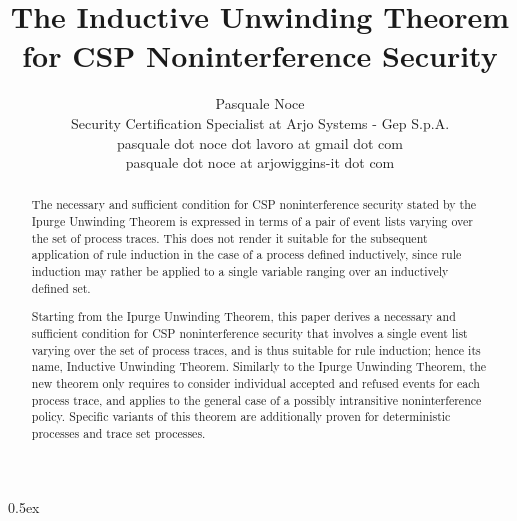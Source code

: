 \documentclass[11pt,a4paper]{article}
\begin{document}
\title{The Inductive Unwinding Theorem\\for CSP Noninterference Security}
\author{Pasquale Noce\\Security Certification Specialist at Arjo Systems - Gep S.p.A.\\pasquale dot noce dot lavoro at gmail dot com\\pasquale dot noce at arjowiggins-it dot com}
\maketitle

\begin{abstract}
The necessary and sufficient condition for CSP noninterference security stated
by the Ipurge Unwinding Theorem is expressed in terms of a pair of event lists
varying over the set of process traces. This does not render it suitable for the
subsequent application of rule induction in the case of a process defined
inductively, since rule induction may rather be applied to a single variable
ranging over an inductively defined set.

Starting from the Ipurge Unwinding Theorem, this paper derives a necessary and
sufficient condition for CSP noninterference security that involves a single
event list varying over the set of process traces, and is thus suitable for rule
induction; hence its name, Inductive Unwinding Theorem. Similarly to the Ipurge
Unwinding Theorem, the new theorem only requires to consider individual accepted
and refused events for each process trace, and applies to the general case of a
possibly intransitive noninterference policy. Specific variants of this theorem
are additionally proven for deterministic processes and trace set processes.
\end{abstract}

\tableofcontents

\parindent 0pt\parskip 0.5ex





\end{document}
